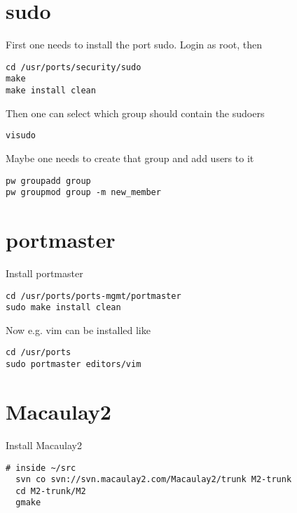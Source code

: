 \documentclass[a4paper]{article}
\begin{document}
\section{sudo}

First one needs to install the port sudo. Login as root, then

\begin{verbatim}
cd /usr/ports/security/sudo
make
make install clean
\end{verbatim}

Then one can select which group should contain the sudoers

\begin{verbatim}
visudo
\end{verbatim}

Maybe one needs to create that group and add users to it

\begin{verbatim}
pw groupadd group
pw groupmod group -m new_member
\end{verbatim}

\section{portmaster}
Install portmaster

\begin{verbatim}
cd /usr/ports/ports-mgmt/portmaster
sudo make install clean
\end{verbatim}

Now e.g. vim can be installed like

\begin{verbatim}
cd /usr/ports
sudo portmaster editors/vim
\end{verbatim}

\section{Macaulay2}
Install Macaulay2

\begin{verbatim}
# inside ~/src
  svn co svn://svn.macaulay2.com/Macaulay2/trunk M2-trunk
  cd M2-trunk/M2
  gmake

\end{verbatim}
\end{document}
